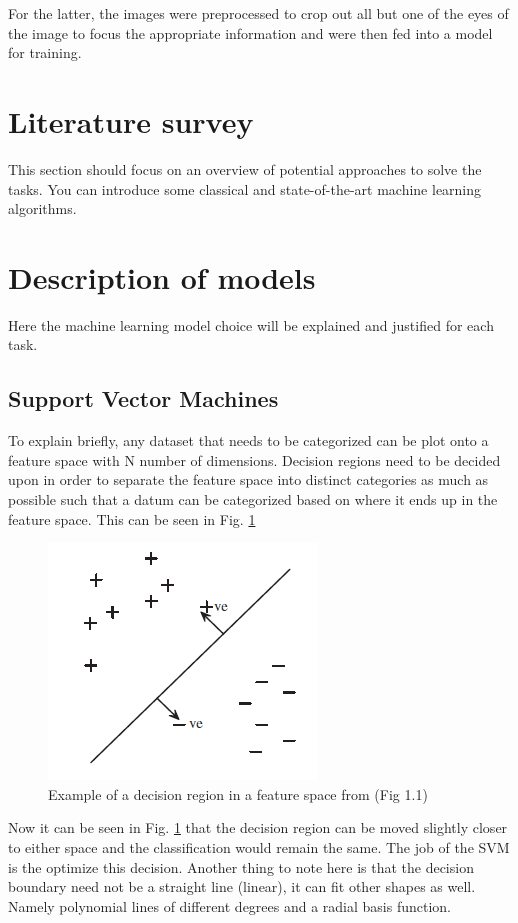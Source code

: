 \documentclass{article}
\begin{document}
    For the latter, the images were preprocessed to crop out all but one of the eyes of the image to focus the appropriate information and were then fed into a model for training.
\section{Literature survey}
\label{sec:lite}
    This section should focus on an overview of potential approaches to solve the tasks. You can introduce some classical and state-of-the-art machine learning algorithms.


\section{Description of models}
\label{sec:models}
    Here the machine learning model choice will be explained and justified for each task. 
    
    \subsection{Support Vector Machines}
    To explain briefly, any dataset that needs to be categorized can be plot onto a feature space with N number of dimensions. Decision regions need to be decided upon in order to separate the feature space into distinct categories as much as possible such that a datum can be categorized based on where it ends up in the feature space. This can be seen in Fig. \ref{fig:example_svm}
    
    \begin{figure}[htb]
    	\centering
    	\includegraphics[scale=0.7]{Figures/Example_SVM.PNG}
    	\caption{Example of a decision region in a feature space from \cite{6812816} (Fig 1.1)}
    	\label{fig:example_svm}
    \end{figure}

    Now it can be seen in Fig. \ref{fig:example_svm} that the decision region can be moved slightly closer to either space and the classification would remain the same. The job of the SVM is the optimize this decision. Another thing to note here is that the decision boundary need not be a straight line (linear), it can fit other shapes as well. Namely polynomial lines of different degrees and a radial basis function. \\
    
\end{document}
